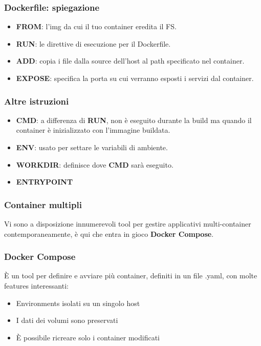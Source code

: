 \documentclass{beamer}
\begin{document}

\begin{frame}
    \frametitle{Dockerfile: spiegazione}
    \begin{itemize}
        \item<1->\textbf{FROM}: l'img da cui il tuo container eredita il FS. 
        \item<2->\textbf{RUN}: le direttive di esecuzione per il Dockerfile.
        \item<3->\textbf{ADD}: copia i file dalla source dell'host al path specificato nel container.
        \item<4->\textbf{EXPOSE}: specifica la porta su cui verranno esposti i servizi dal container.
    \end{itemize}
\end{frame}


\begin{frame}    
    \frametitle{Altre istruzioni}
    \begin{itemize}
        \item<1-> \textbf{CMD}: a differenza di \textbf{RUN}, non \`e eseguito durante la build ma quando il container \`e inizializzato con l'immagine buildata.
        \item<2-> \textbf{ENV}: usato per settare le variabili di ambiente. 
        \item<3-> \textbf{WORKDIR}: definisce dove \textbf{CMD} sar\`a eseguito. 
        \item<4-> \textbf{ENTRYPOINT} 
    \end{itemize}
\end{frame}


\begin{frame}
    \frametitle{Container multipli}
    Vi sono a disposizione innumerevoli tool per gestire applicativi multi-container contemporaneamente, \`e qui che entra in gioco \textbf{Docker Compose}.
\end{frame}


\begin{frame}
    \frametitle{Docker Compose}
    \`E un tool per definire e avviare pi\`u container, definiti in un file .yaml, con molte features interessanti:
    \begin{itemize}
        \item<1-> Environments isolati su un singolo host
        \item<2-> I dati dei volumi sono preservati
        \item<3-> \`E possibile ricreare solo i container modificati
    \end{itemize}
\end{frame}
\end{document}
